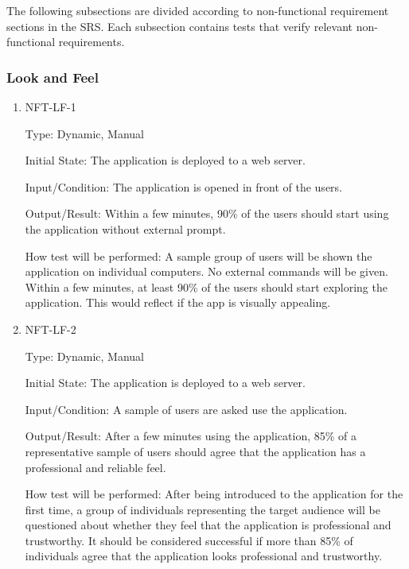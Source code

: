 \documentclass[12pt, titlepage]{article}
\begin{document}


The following subsections are divided according to non-functional requirement sections in the SRS. Each subsection contains tests that verify relevant non-functional requirements.

\subsubsection{Look and Feel}
		

\begin{enumerate}

\item{NFT-LF-1}

Type: Dynamic, Manual
					
Initial State: The application is deployed to a web server.
					
Input/Condition: The application is opened in front of the users.
					
Output/Result: Within a few minutes, 90\% of the users should start using the application without external prompt.
					
How test will be performed: A sample group of users will be shown the application on individual computers. No external commands will be given. Within a few minutes, at least 90\% of the users should start exploring the application. This would reflect if the app is visually appealing.

\item{NFT-LF-2}

Type: Dynamic, Manual
					
Initial State: The application is deployed to a web server.
					
Input/Condition: A sample of users are asked use the application.
					
Output/Result: After a few minutes using the application, 85\% of a representative sample of users should agree that the application has a professional and reliable feel.
					
How test will be performed: After being introduced to the application for the first time, a group of individuals representing the target audience will be questioned about whether they feel that the application is professional and trustworthy. It should be considered successful if more than 85\% of individuals agree that the application looks professional and trustworthy.

\end{enumerate}
\end{document}

